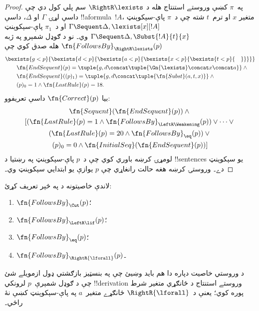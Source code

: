 \documentclass[../../../include/open-logic-section]{subfiles}
\begin{document}
\begin{proof}
په~$\pi$ کښې وروستے استنتاج هله د $\RightR\lexists$ سم پلي کول
دي چې داسې لړۍ $\Gamma$ او $\Delta$، داسې !!a{formula}~$!A$، متغير
$x$ او ترم~$t$ شته چې د~$\pi$ پاې-سېکوېنټ
$\Gamma \Sequent \Delta,\lexists[x][!A]$ او د~$\pi_1$
پاې-سېکوېنټ $\Gamma \Sequent \Delta,\Subst{!A}{t}{x}$ وي۔ نو د
ګوډل شمېرو په ژبه $\fn{FollowsBy}_{\RightR\lexists}(p)$ هله صدق کوي
چې
\begin{align*}
  & \bexists{g<p}{\bexists{d<p}{\bexists{a<p}{\bexists{x<p}{\bexists{t<p}{\quad}}}}}\\
  & \qquad \fn{EndSequent}(p) =
  \tuple{
    g,
    d \concat \tuple{\Gn{\lexists} \concat x \concat a}
  } \land {}\\
  & \qquad \fn{EndSequent}((p)_1) =
  \tuple{
    g,
    d \concat \tuple{\fn{Subst}(a, t, x)}
  } \land {}\\
  & \qquad (p)_0 = 1 \land \fn{LastRule}(p) = 18.
\end{align*}
بيا $\fn{Correct}(p)$ داسې تعريفوو:
\begin{multline*}
  \fn{Sequent}(\fn{EndSequent}(p)) \land {}\\
  [(\fn{LastRule}(p) = 1 \land
  \fn{FollowsBy}_{\LeftR\Weakening}(p)) \lor \dots \lor {}\\
  (\fn{LastRule}(p) = 20 \land \fn{FollowsBy}_{\eq}(p)) \lor {}\\
  (p)_0 = 0 \land \fn{InitialSeq}(\fn{EndSequent}(p))]
\end{multline*}
لومړۍ کرښه باوري کوي چې د~$p$ پاې-سېکوېنټ په رښتيا د
!!{sentence}s يو سېکوېنټ دے۔ وروستۍ کرښه هغه حالت رانغاړي چې $p$
يوازې يو ابتدايي سېکوېنټ وي۔
\end{proof}

\begin{prob}
  لاندې خاصيتونه د  په څېر
  تعريف کړئ:
  \begin{enumerate}
  \item $\fn{FollowsBy}_{\Cut}(p)$؛
  \item $\fn{FollowsBy}_{\LeftR\lif}(p)$؛
  \item $\fn{FollowsBy}_{\eq}(p)$؛
  \item $\fn{FollowsBy}_{\RightR{\lforall}}(p)$۔
  \end{enumerate}
  د وروستي خاصيت دپاره دا هم بايد وښيئ چې په بنسټيز بازګشتي ډول
  ازمويلے شئ چې د ګوډل شمېرې~$p$ لرونکي !!{derivation} وروستے
  استنتاج د ځانګړي متغير شرط پوره کوي؛ يعنې د~$\RightR{\lforall}$
  ځانګړے متغير~$a$ په پاې-سېکوېنټ کښې نۀ راځي۔
\end{prob}
\end{document}
